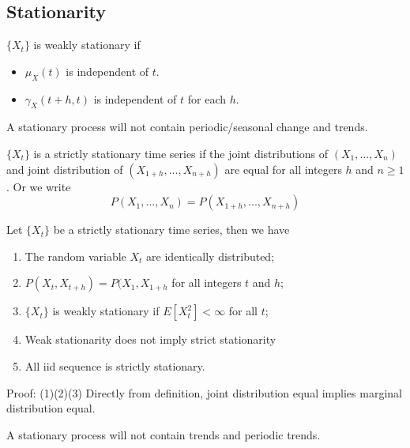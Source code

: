 \subsection{Stationarity}

\begin{definition}
	\cite[15]{brockwell2002introduction}$\{X_t\}$ is weakly stationary if 
	\begin{itemize}
		\item $\mu_X(t)$ is independent of $t$.
		\item $\gamma_X(t+h,t)$ is independent of $t$ for each $h$.
	\end{itemize}
\end{definition}



\begin{remark}
	A stationary process will not contain periodic/seasonal change and trends.
\end{remark}

\begin{definition}
	\cite[49]{brockwell2002introduction} $\{X_t\}$ is a strictly stationary time series if the joint distributions of $(X_1,...,X_n)$ and joint distribution of $(X_{1+h},...,X_{n+h})$ are equal for all integers $h$ and $n \geq 1$. Or we write
	$$P(X_1,...,X_n) = P(X_{1+h},...,X_{n+h})$$
\end{definition}

\begin{lemma}
	\cite[49]{brockwell2002introduction} Let $\{X_t\}$ be a strictly stationary time series, then we have
	\begin{enumerate}
		\item The random variable $X_t$ are identically distributed;
		\item $P(X_t,X_{t+h}) = P(X_1,X_{1+h}$ for all integers $t$ and $h$;
		\item $\{X_t\}$ is weakly stationary if $E[X_t^2] < \infty $ for all $t$;
		\item Weak stationarity does not imply strict stationarity
		\item All iid sequence is strictly stationary.
	\end{enumerate}
\end{lemma}
Proof: (1)(2)(3) Directly from definition, joint distribution equal implies marginal distribution equal.

\begin{remark}
	A stationary process will not contain trends and periodic trends.
\end{remark}


